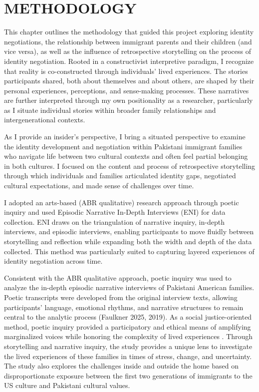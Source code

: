 \chapter{\texorpdfstring{METHODOLOGY}{}} %

This chapter outlines the methodology that guided this project exploring identity negotiations, the relationship between immigrant parents and their children (and vice versa), as well as the influence of retrospective storytelling on the process of identity negotiation. Rooted in a constructivist interpretive paradigm, I recognize that reality is co-constructed through individuals’ lived experiences. The stories participants shared, both about themselves and about others, are shaped by their personal experiences, perceptions, and sense-making processes. These narratives are further interpreted through my own positionality as a researcher, particularly as I situate individual stories within broader family relationships and intergenerational contexts. 

As I provide an insider's perspective, I bring a situated perspective to examine the identity development and negotiation within Pakistani immigrant families who navigate life between two cultural contexts and often feel partial belonging in both cultures. I focused on the content and process of retrospective storytelling through which individuals and families articulated identity gaps, negotiated cultural expectations, and made sense of challenges over time. 

I adopted an arts-based (ABR qualitative) research approach through poetic inquiry and used Episodic Narrative In-Depth Interviews (ENI) for data collection. ENI draws on the triangulation of narrative inquiry, in-depth interviews, and episodic interviews, enabling participants to move fluidly between storytelling and reflection while expanding both the width and depth of the data collected. This method was particularly suited to capturing layered experiences of identity negotiation across time.

Consistent with the ABR qualitative approach, poetic inquiry was used to analyze the in-depth episodic narrative interviews of Pakistani American families. Poetic transcripts were developed from the original interview texts, allowing participants’ language, emotional rhythms, and narrative structures to remain central to the analytic process (Faulkner 2025, 2019). As a social justice-oriented method, poetic inquiry provided a participatory and ethical means of amplifying marginalized voices while honoring the complexity of lived experiences \citep{gioiachiltonArtsBasedResearchPractice2014}.  Through storytelling and narrative inquiry, the study provides a unique lens to investigate the lived experiences of these families in times of stress, change, and uncertainty. The study also explores the challenges inside and outside the home based on disproportionate exposure between the first two generations of immigrants to the US culture and Pakistani cultural values.

